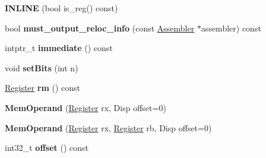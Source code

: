 \begin{DoxyCompactItemize}
\item 
{\bfseries I\+N\+L\+I\+NE} (bool is\+\_\+reg() const)\hypertarget{classv8_1_1internal_1_1_b_a_s_e___e_m_b_e_d_d_e_d_af96ed83955e2626794405e249b11dabd}{}\label{classv8_1_1internal_1_1_b_a_s_e___e_m_b_e_d_d_e_d_af96ed83955e2626794405e249b11dabd}

\item 
bool {\bfseries must\+\_\+output\+\_\+reloc\+\_\+info} (const \hyperlink{classv8_1_1internal_1_1_assembler}{Assembler} $\ast$assembler) const \hypertarget{classv8_1_1internal_1_1_b_a_s_e___e_m_b_e_d_d_e_d_a7de2cb63e5bc60d5444fef0f05f51808}{}\label{classv8_1_1internal_1_1_b_a_s_e___e_m_b_e_d_d_e_d_a7de2cb63e5bc60d5444fef0f05f51808}

\item 
intptr\+\_\+t {\bfseries immediate} () const \hypertarget{classv8_1_1internal_1_1_b_a_s_e___e_m_b_e_d_d_e_d_a078425f3a5bd61944d55ccebd04b1916}{}\label{classv8_1_1internal_1_1_b_a_s_e___e_m_b_e_d_d_e_d_a078425f3a5bd61944d55ccebd04b1916}

\item 
void {\bfseries set\+Bits} (int n)\hypertarget{classv8_1_1internal_1_1_b_a_s_e___e_m_b_e_d_d_e_d_a8de0083099e78c479472f62688f2f71f}{}\label{classv8_1_1internal_1_1_b_a_s_e___e_m_b_e_d_d_e_d_a8de0083099e78c479472f62688f2f71f}

\item 
\hyperlink{structv8_1_1internal_1_1_register}{Register} {\bfseries rm} () const \hypertarget{classv8_1_1internal_1_1_b_a_s_e___e_m_b_e_d_d_e_d_a3b52dc72ba96afd1a2469b5e3e490851}{}\label{classv8_1_1internal_1_1_b_a_s_e___e_m_b_e_d_d_e_d_a3b52dc72ba96afd1a2469b5e3e490851}

\item 
{\bfseries Mem\+Operand} (\hyperlink{structv8_1_1internal_1_1_register}{Register} rx, Disp offset=0)\hypertarget{classv8_1_1internal_1_1_b_a_s_e___e_m_b_e_d_d_e_d_a7cb082acc096f9e6ab3c6e7c10d6a087}{}\label{classv8_1_1internal_1_1_b_a_s_e___e_m_b_e_d_d_e_d_a7cb082acc096f9e6ab3c6e7c10d6a087}

\item 
{\bfseries Mem\+Operand} (\hyperlink{structv8_1_1internal_1_1_register}{Register} rx, \hyperlink{structv8_1_1internal_1_1_register}{Register} rb, Disp offset=0)\hypertarget{classv8_1_1internal_1_1_b_a_s_e___e_m_b_e_d_d_e_d_a6195da47123d660d504977eb25bcfd8d}{}\label{classv8_1_1internal_1_1_b_a_s_e___e_m_b_e_d_d_e_d_a6195da47123d660d504977eb25bcfd8d}

\item 
int32\+\_\+t {\bfseries offset} () const \hypertarget{classv8_1_1internal_1_1_b_a_s_e___e_m_b_e_d_d_e_d_accdbab5ff0e51a3b9f685c77a11075e6}{}\label{classv8_1_1internal_1_1_b_a_s_e___e_m_b_e_d_d_e_d_accdbab5ff0e51a3b9f685c77a11075e6}


\end{DoxyCompactItemize}

